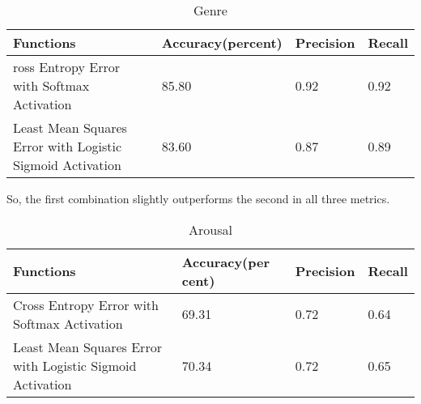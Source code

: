 \begin{table}[h!]
        \caption{Genre}
        \begin{center}
                \begin{tabular}{|l|l|l|l|}
                        \hline

                        Functions
                        &
                        Accuracy(percent)
                        &
                        Precision
                        &
                        Recall
                        \\\hline

ross Entropy Error with Softmax Activation
&
85.80
&
0.92
&
0.92
\\\hline

Least Mean Squares Error with Logistic Sigmoid Activation 
&
83.60
&
0.87
&
0.89
\\\hline
                 \end{tabular}
        \end{center}
\end{table}
So, the first combination slightly outperforms the second in all three metrics. 
\begin{table}[h!]
        \caption{Arousal}
        \begin{center}
                \begin{tabular}{|l|l|l|l|}
                        \hline

                        Functions
                        &
                        Accuracy(per cent)
                        &
                        Precision
                        &
                        Recall
                        \\\hline

                        Cross Entropy Error with Softmax Activation
                        &
                        69.31
                        &
                        0.72
                        &
                        0.64
                        \\\hline
                        
                        Least Mean Squares Error with Logistic Sigmoid Activation 
                        &
                        70.34
                        &
                        0.72
                        &
                        0.65
                        \\\hline

                 \end{tabular}
        \end{center}
\end{table}
